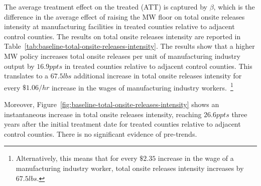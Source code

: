 \documentclass[12pt, english]{article}
\begin{document}
    The average treatment effect on the treated (ATT) is captured by $\beta$, which is the difference in the average effect of raising the MW floor on total onsite releases intensity at manufacturing facilities in treated counties relative to adjacent control counties. The results on total onsite releases intensity are reported in Table~\ref{tab:baseline-total-onsite-releases-intensity}. The results show that a higher MW policy increases total onsite releases per unit of manufacturing industry output by $16.9ppts$ in treated counties relative to adjacent control counties. This translates to a $67.5lbs$ additional increase in total onsite releases intensity for every $\$1.06/hr$ increase in the wages of manufacturing industry workers.~\footnote{\tiny Alternatively, this means that for every $\$2.35$ increase in the wage of a manufacturing industry worker, total onsite releases intensity increases by $67.5lbs$.}
    

    Moreover, Figure~\ref{fig:baseline-total-onsite-releases-intensity} shows an instantaneous increase in total onsite releases intensity, reaching $26.6ppts$ three years after the initial treatment date for treated counties relative to adjacent control counties. There is no significant evidence of pre-trends.
\end{document}
